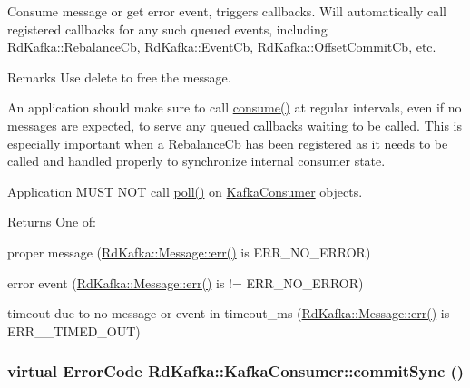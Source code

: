 Consume message or get error event, triggers callbacks. Will automatically call registered callbacks for any such queued events, including \hyperlink{classRdKafka_1_1RebalanceCb}{RdKafka::RebalanceCb}, \hyperlink{classRdKafka_1_1EventCb}{RdKafka::EventCb}, \hyperlink{classRdKafka_1_1OffsetCommitCb}{RdKafka::OffsetCommitCb}, etc.

\begin{DoxyRemark}{Remarks}
Use {\ttfamily delete} to free the message.

An application should make sure to call \hyperlink{classRdKafka_1_1KafkaConsumer_a7dc106f1c3b99767a0930a9cf8cabf84}{consume()} at regular intervals, even if no messages are expected, to serve any queued callbacks waiting to be called. This is especially important when a \hyperlink{classRdKafka_1_1RebalanceCb}{RebalanceCb} has been registered as it needs to be called and handled properly to synchronize internal consumer state.

Application MUST NOT call {\ttfamily \hyperlink{classRdKafka_1_1Handle_a98d3b4ee48457ff13e4d5155e3fc5ea4}{poll()}} on \hyperlink{classRdKafka_1_1KafkaConsumer}{KafkaConsumer} objects.
\end{DoxyRemark}
\begin{DoxyReturn}{Returns}
One of:
\begin{DoxyItemize}
\item proper message (\hyperlink{classRdKafka_1_1Message_a90df1fd2a73a74220c9581e6bedb42f2}{RdKafka::Message::err()} is ERR\_\-NO\_\-ERROR)
\item error event (\hyperlink{classRdKafka_1_1Message_a90df1fd2a73a74220c9581e6bedb42f2}{RdKafka::Message::err()} is != ERR\_\-NO\_\-ERROR)
\item timeout due to no message or event in {\ttfamily timeout\_\-ms} (\hyperlink{classRdKafka_1_1Message_a90df1fd2a73a74220c9581e6bedb42f2}{RdKafka::Message::err()} is ERR\_\-\_\-TIMED\_\-OUT) 
\end{DoxyItemize}
\end{DoxyReturn}
\hypertarget{classRdKafka_1_1KafkaConsumer_a1c421bf2b44509704ad3d9e785c5b15c}{
\subsubsection[{commitSync}]{\setlength{\rightskip}{0pt plus 5cm}virtual ErrorCode RdKafka::KafkaConsumer::commitSync ()}}
\label{classRdKafka_1_1KafkaConsumer_a1c421bf2b44509704ad3d9e785c5b15c}


